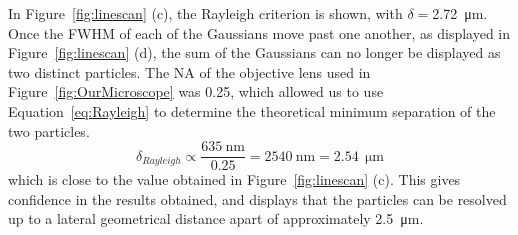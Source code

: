 In Figure~\ref{fig:linescan} (c), the Rayleigh criterion is shown, with
$\delta=$\SI{2.72}{\micro\meter}. Once the FWHM of each of the Gaussians move past one
another, as displayed in Figure~\ref{fig:linescan} (d), the sum of the
Gaussians can no longer be displayed as two distinct particles. The NA of the
objective lens used in Figure~\ref{fig:OurMicroscope} was 0.25, which allowed
us to use Equation~\ref{eq:Rayleigh} to determine the theoretical minimum
separation of the two particles.
\begin{equation}
    \delta_{Rayleigh} \propto \frac{635~\mathrm{nm}}{0.25} = 2540~\mathrm{nm} =
    2.54~\mathrm{\SI{}{\micro\meter}}
\end{equation}
which is close to the value obtained in Figure~\ref{fig:linescan} (c).
This gives confidence in the results obtained, and displays that the particles
can be resolved up to a lateral
geometrical distance apart of approximately
\SI{2.5}{\micro\meter}.






%
%
%
%
%
